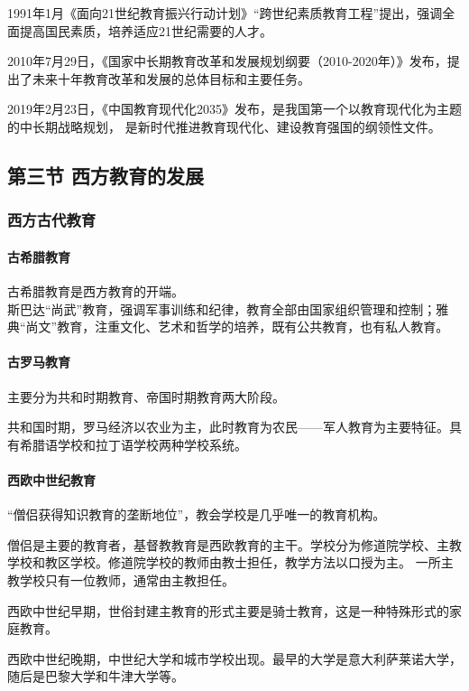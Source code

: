 \documentclass[b5paper,11pt]{article}
\begin{document}
1991年1月《面向21世纪教育振兴行动计划》\textcolor{ctp-red}{“跨世纪素质教育工程”}提出，强调全面提高国民素质，培养适应21世纪需要的人才。

2010年7月29日，《国家中长期教育改革和发展规划纲要（2010-2020年）》发布，提出了未来十年教育改革和发展的总体目标和主要任务。

2019年2月23日，\textcolor{ctp-red}{《中国教育现代化2035》}发布，是我国第一个以\textcolor{ctp-red}{教育现代化为主题的中长期战略规划}，
是新时代推进教育现代化、建设教育强国的纲领性文件。

\subsection{第三节 \space 西方教育的发展}

\subsubsection{西方古代教育}
\paragraph{古希腊教育} 古希腊教育是西方教育的开端。\\
斯巴达“尚武”教育，强调军事训练和纪律，教育全部由国家组织管理和控制；雅典“尚文”教育，注重文化、艺术和哲学的培养，既有公共教育，也有私人教育。

\paragraph{古罗马教育} 主要分为\textcolor{ctp-red}{共和时期教育、帝国时期教育}两大阶段。

共和国时期，罗马经济以农业为主，此时教育为农民——军人教育为主要特征。具有希腊语学校和拉丁语学校两种学校系统。

\paragraph{西欧中世纪教育} “僧侣获得知识教育的垄断地位”，教会学校是几乎唯一的教育机构。

僧侣是主要的教育者，基督教教育是西欧教育的主干。学校分为修道院学校、主教学校和教区学校。修道院学校的教师由教士担任，教学方法以口授为主。
一所主教学校只有一位教师，通常由主教担任。

西欧中世纪早期，世俗封建主教育的形式主要是\textcolor{ctp-red}{骑士教育}，这是一种特殊形式的\textcolor{ctp-red}{家庭教育}。

西欧中世纪晚期，\textcolor{ctp-red}{中世纪大学和城市学校}出现。最早的大学是\textcolor{ctp-red}{意大利萨莱诺大学}，
随后是\textcolor{ctp-red}{巴黎大学}和\textcolor{ctp-red}{牛津大学}等。
\end{document}
